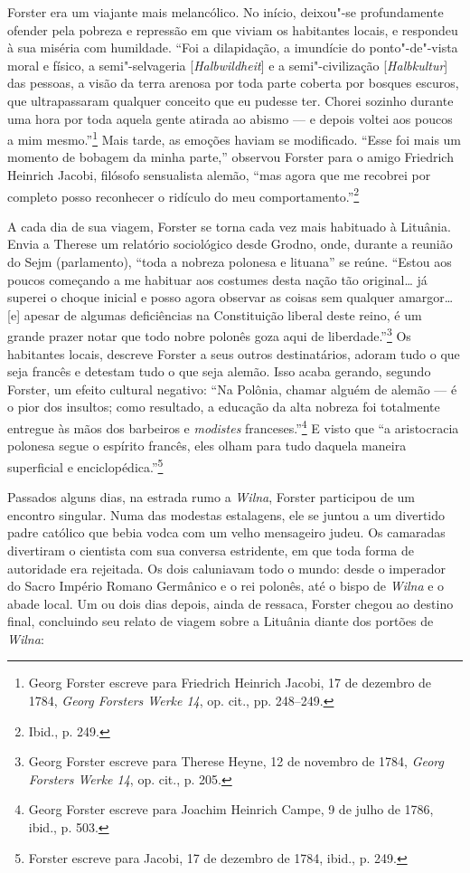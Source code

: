 Forster era um viajante mais melancólico. No início, deixou"-se
profundamente ofender pela pobreza e repressão em que viviam os
habitantes locais, e respondeu à sua miséria com humildade. ``Foi a
dilapidação, a imundície do ponto"-de"-vista moral e físico, a
semi"-selvageria {[}\textit{Halbwildheit}{]} e a semi"-civilização
{[}\textit{Halbkultur}{]} das pessoas, a visão da terra arenosa por toda
parte coberta por bosques escuros, que ultrapassaram qualquer conceito
que eu pudesse ter. Chorei sozinho durante uma hora por toda aquela
gente atirada ao abismo --- e depois voltei aos poucos a mim
mesmo.''\footnote{Georg Forster escreve para Friedrich Heinrich Jacobi, 17 de dezembro de 1784, \textit{Georg Forsters Werke 14}, op. cit., pp. 248--249.} Mais tarde, as emoções haviam se modificado. ``Esse foi mais um momento de bobagem da minha parte,'' observou Forster para o amigo
Friedrich Heinrich Jacobi, filósofo sensualista alemão, ``mas agora que
me recobrei por completo posso reconhecer o ridículo do meu
comportamento.''\footnote{Ibid., p. 249.}

A cada dia de sua viagem, Forster se torna cada vez mais habituado à
Lituânia. Envia a Therese um relatório sociológico desde Grodno, onde,
durante a reunião do Sejm (parlamento), ``toda a nobreza polonesa e
lituana'' se reúne. ``Estou aos poucos começando a me habituar aos
costumes desta nação tão original\ldots{} já superei o choque inicial e
posso agora observar as coisas sem qualquer amargor\ldots{} {[}e{]}
apesar de algumas deficiências na Constituição liberal deste reino, é um
grande prazer notar que todo nobre polonês goza aqui de
liberdade.''\footnote{Georg Forster escreve para Therese Heyne, 12 de novembro de 1784, \textit{Georg Forsters Werke 14}, op. cit., p. 205.} Os habitantes locais, descreve Forster a seus outros destinatários,
adoram tudo o que seja francês e detestam tudo o que seja alemão. Isso
acaba gerando, segundo Forster, um efeito cultural negativo: ``Na
Polônia, chamar alguém de alemão --- é o pior dos insultos; como
resultado, a educação da alta nobreza foi totalmente entregue às mãos
dos barbeiros e \textit{modistes} franceses.''\footnote{Georg Forster escreve para Joachim Heinrich Campe, 9 de julho de 1786, ibid., p. 503.} E visto que ``a aristocracia polonesa segue o espírito francês, eles olham para tudo daquela maneira superficial e
enciclopédica.''\footnote{Forster escreve para Jacobi, 17 de dezembro de 1784, ibid., p. 249.}

Passados alguns dias, na estrada rumo a \textit{Wilna}, Forster participou de um
encontro singular. Numa das modestas estalagens, ele se juntou a um
divertido padre católico que bebia vodca com um velho mensageiro judeu.
Os camaradas divertiram o cientista com sua conversa estridente, em que
toda forma de autoridade era rejeitada. Os dois caluniavam todo o mundo:
desde o imperador do Sacro Império Romano Germânico e o rei polonês, até
o bispo de \textit{Wilna} e o abade local. Um ou dois dias depois, ainda de
ressaca, Forster chegou ao destino final, concluindo seu relato de
viagem sobre a Lituânia diante dos portões de \textit{Wilna}:


